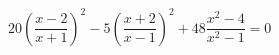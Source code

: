 \begin{ex}[type=equation]
	\begin{condition}
		$20\left(\dfrac{x -2}{x + 1}\right)^2 - 5\left(\dfrac{x + 2}{x - 1}\right)^2  + 48\dfrac{x^2 - 4}{x^2 - 1} = 0$
	\end{condition}
\end{ex}